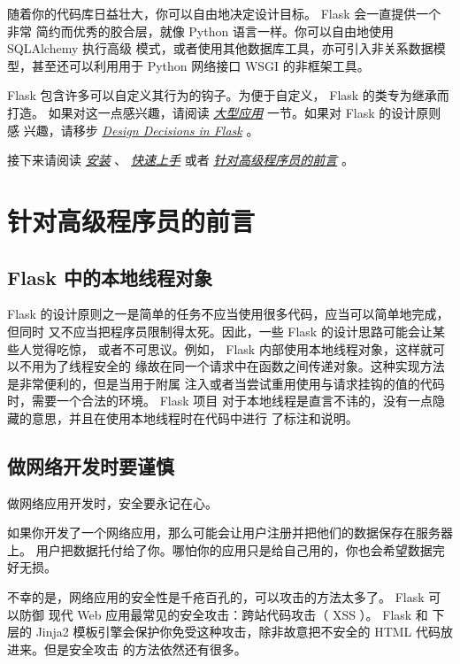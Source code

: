 \documentclass[a4paper,12pt]{sphinxmanual}
\begin{document}
随着你的代码库日益壮大，你可以自由地决定设计目标。 Flask 会一直提供一个非常
简约而优秀的胶合层，就像 Python 语言一样。你可以自由地使用 SQLAlchemy 执行高级
模式，或者使用其他数据库工具，亦可引入非关系数据模型，甚至还可以利用用于
Python 网络接口 WSGI 的非框架工具。

Flask 包含许多可以自定义其行为的钩子。为便于自定义， Flask 的类专为继承而打造。
如果对这一点感兴趣，请阅读 {\hyperref[becomingbig:becomingbig]{\emph{大型应用}}} 一节。如果对 Flask 的设计原则感
兴趣，请移步 {\hyperref[design:design]{\emph{Design Decisions in Flask}}} 。

接下来请阅读 {\hyperref[installation:installation]{\emph{安装}}} 、 {\hyperref[quickstart:quickstart]{\emph{快速上手}}} 或者
{\hyperref[advanced_foreword:advanced-foreword]{\emph{针对高级程序员的前言}}} 。


\chapter{针对高级程序员的前言}
\label{advanced_foreword:advanced-foreword}\label{advanced_foreword::doc}\label{advanced_foreword:id1}

\section{Flask 中的本地线程对象}
\label{advanced_foreword:flask}
Flask 的设计原则之一是简单的任务不应当使用很多代码，应当可以简单地完成，但同时
又不应当把程序员限制得太死。因此，一些 Flask 的设计思路可能会让某些人觉得吃惊，
或者不可思议。例如， Flask 内部使用本地线程对象，这样就可以不用为了线程安全的
缘故在同一个请求中在函数之间传递对象。这种实现方法是非常便利的，但是当用于附属
注入或者当尝试重用使用与请求挂钩的值的代码时，需要一个合法的环境。 Flask 项目
对于本地线程是直言不讳的，没有一点隐藏的意思，并且在使用本地线程时在代码中进行
了标注和说明。


\section{做网络开发时要谨慎}
\label{advanced_foreword:id2}
做网络应用开发时，安全要永记在心。

如果你开发了一个网络应用，那么可能会让用户注册并把他们的数据保存在服务器上。
用户把数据托付给了你。哪怕你的应用只是给自己用的，你也会希望数据完好无损。

不幸的是，网络应用的安全性是千疮百孔的，可以攻击的方法太多了。 Flask 可以防御
现代 Web 应用最常见的安全攻击：跨站代码攻击（ XSS ）。 Flask 和 下层的 Jinja2
模板引擎会保护你免受这种攻击，除非故意把不安全的 HTML 代码放进来。但是安全攻击
的方法依然还有很多。
\end{document}
